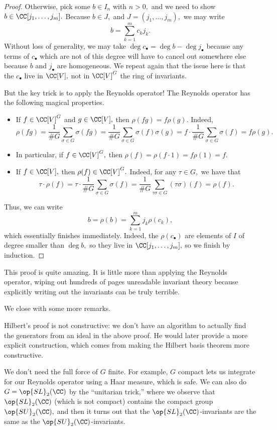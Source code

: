 \begin{proof}
	Otherwise, pick some $b\in I_n$ with $n>0,$ and we need to show $b\in\CC[j_1,\ldots,j_m].$ Because $b\in J,$ and $J=(j_1,\ldots,j_m),$ we may write
	\[b=\sum_{k=1}^mc_kj_k.\]
	Without loss of generality, we may take $\deg c_\bullet=\deg b-\deg j_\bullet$ because any terms of $c_\bullet$ which are not of this degree will have to cancel out somewhere else because $b$ and $j_\bullet$ are homogeneous. We repeat again that the issue here is that the $c_\bullet$ live in $\CC[V],$ not in $\CC[V]^G$ the ring of invariants.

	But the key trick is to apply the Reynolds operator! The Reynolds operator has the following magical properties.
	\begin{itemize}
		\item If $f\in\CC[V]^G$ and $g\in\CC[V],$ then $\rho(fg)=f\rho(g).$ Indeed,
		\[\rho(fg)=\frac1{\#G}\sum_{\sigma\in G}\sigma(fg)=\frac1{\#G}\sum_{\sigma\in G}\sigma(f)\sigma(g)=f\cdot\frac1{\#G}\sum_{\sigma\in G}\sigma(f)=f\rho(g).\]
		\item In particular, if $f\in\CC[V]^G,$ then $\rho(f)=\rho(f\cdot1)=f\rho(1)=f.$
		\item If $f\in\CC[V],$ then $\rho(f)\in\CC[V]^G.$ Indeed, for any $\tau\in G,$ we have that
		\[\tau\cdot\rho(f)=\tau\cdot\frac1{\#G}\sum_{\sigma\in G}\sigma(f)=\frac1{\#G}\sum_{\tau\sigma\in G}(\tau\sigma)(f)=\rho(f).\]
	\end{itemize}
	Thus, we can write
	\[b=\rho(b)=\sum_{k=1}^mj_k\rho(c_k),\]
	which essentially finishes immediately. Indeed, the $\rho(c_\bullet)$ are elements of $I$ of degree smaller than $\deg b,$ so they live in $\CC[j_1,\ldots,j_m],$ so we finish by induction.
\end{proof}
\begin{remark}
	This proof is quite amazing. It is little more than applying the Reynolds operator, wiping out hundreds of pages unreadable invariant theory because explicitly writing out the invariants can be truly terrible.
\end{remark}
We close with some more remarks.
\begin{remark}
	Hilbert's proof is not constructive: we don't have an algorithm to actually find the generators from an ideal in the above proof. He would later provide a more explicit construction, which comes from making the Hilbert basis theorem more constructive.
\end{remark}
\begin{remark}
	We don't need the full force of $G$ finite. For example, $G$ compact lets us integrate for our Reynolds operator using a Haar measure, which is safe. We can also do $G=\op{SL}_2(\CC)$ by the ``unitarian trick,'' where we observe that $\op{SL}_2(\CC)$ (which is not compact) contains the compact group $\op{SU}_2(\CC),$ and then it turns out that the $\op{SL}_2(\CC)$-invariants are the same as the $\op{SU}_2(\CC)$-invariants.
\end{remark}
